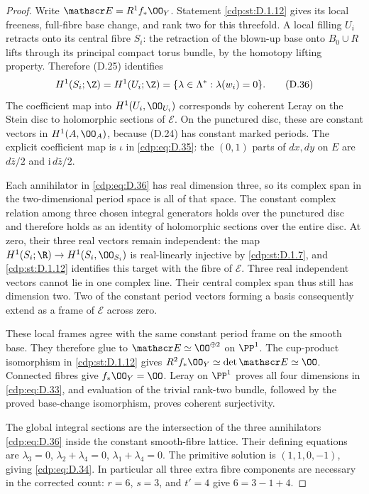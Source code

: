 \begin{proof}
Write $\mathscr E=R^1f_*\OO_Y$. Statement \ref{cdp:st:D.1.12} gives its
local freeness, full-fibre base change, and rank two for this
threefold. A local filling $U_i$ retracts onto its central
fibre $S_i$: the retraction of the blown-up base onto
$B_0\cup R$ lifts through its principal compact torus
bundle, by the homotopy lifting property. Therefore (D.25)
identifies
\[
 H^1(S_i;\Z)=H^1(U_i;\Z)
          =\{\lambda\in\Lambda^*:\lambda(w_i)=0\}.
\tag{D.36}\label{cdp:eq:D.36}
\]
The coefficient map into $H^1(U_i,\OO_{U_i})$
corresponds by coherent Leray on the Stein disc to
holomorphic sections of $\mathscr E$. On the punctured
disc, these are constant vectors in $H^1(A,\OO_A)$,
because (D.24) has constant marked periods. The explicit
coefficient map is $\iota$ in \eqref{cdp:eq:D.35}: the $(0,1)$ parts
of $dx,dy$ on $E$ are $d\bar z/2$ and
$\mathrm i\,d\bar z/2$.

Each annihilator in \eqref{cdp:eq:D.36} has real dimension three, so
its complex span in the two-dimensional period space is
all of that space. The constant complex relation among
three chosen integral generators holds over the
punctured disc and therefore holds as an identity of
holomorphic sections over the entire disc. At zero,
their three real vectors remain independent: the map
$H^1(S_i;\R)\to H^1(S_i,\OO_{S_i})$ is real-linearly
injective by \ref{cdp:st:D.1.7}, and \ref{cdp:st:D.1.12} identifies this target
with the fibre of $\mathscr E$. Three real independent
vectors cannot lie in one complex line. Their central
complex span thus still has dimension two. Two of the
constant period vectors forming a basis consequently
extend as a frame of $\mathscr E$ across zero.

These local frames agree with the same constant period
frame on the smooth base. They therefore glue to
$\mathscr E\simeq\OO^{\oplus2}$ on $\PP^1$.
The cup-product isomorphism in \ref{cdp:st:D.1.12} gives
$R^2f_*\OO_Y\simeq\det\mathscr E\simeq\OO$.
Connected fibres give $f_*\OO_Y=\OO$. Leray on $\PP^1$
proves all four dimensions in \eqref{cdp:eq:D.33}, and evaluation
of the trivial rank-two bundle, followed by the proved
base-change isomorphism, proves coherent surjectivity.

The global integral sections are the intersection of
the three annihilators \eqref{cdp:eq:D.36} inside the constant
smooth-fibre lattice. Their defining equations are
$\lambda_3=0$, $\lambda_2+\lambda_4=0$,
$\lambda_1+\lambda_4=0$. The primitive solution is
$(1,1,0,-1)$, giving \eqref{cdp:eq:D.34}. In particular all three
extra fibre components are necessary in the corrected
count: $r=6$, $s=3$, and $t'=4$ give
$6=3-1+4$.


\end{proof}
